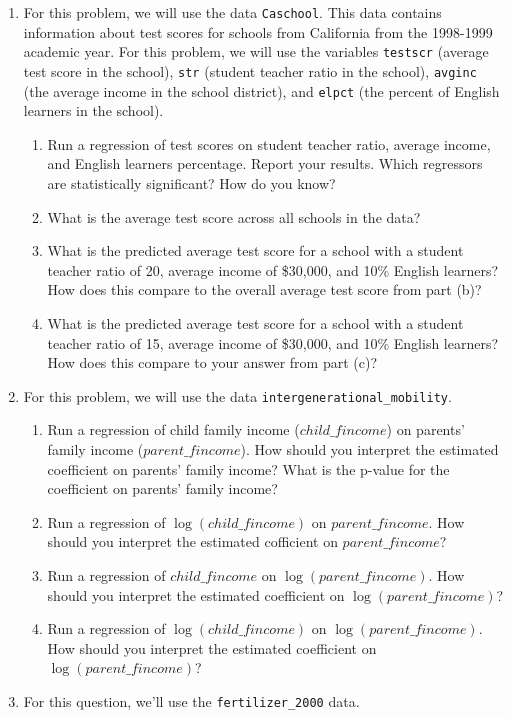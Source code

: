 \documentclass[
  letterpaper,
  DIV=11,
  numbers=noendperiod]{scrreprt}
\begin{document}
\begin{enumerate}
\def\labelenumi{\arabic{enumi}.}
\item
  For this problem, we will use the data \texttt{Caschool}. This data
  contains information about test scores for schools from California
  from the 1998-1999 academic year. For this problem, we will use the
  variables \texttt{testscr} (average test score in the school),
  \texttt{str} (student teacher ratio in the school), \texttt{avginc}
  (the average income in the school district), and \texttt{elpct} (the
  percent of English learners in the school).

  \begin{enumerate}
  \def\labelenumii{\alph{enumii})}
  \item
    Run a regression of test scores on student teacher ratio, average
    income, and English learners percentage. Report your results. Which
    regressors are statistically significant? How do you know?
  \item
    What is the average test score across all schools in the data?
  \item
    What is the predicted average test score for a school with a student
    teacher ratio of 20, average income of \$30,000, and 10\% English
    learners? How does this compare to the overall average test score
    from part (b)?
  \item
    What is the predicted average test score for a school with a student
    teacher ratio of 15, average income of \$30,000, and 10\% English
    learners? How does this compare to your answer from part (c)?
  \end{enumerate}
\item
  For this problem, we will use the data
  \texttt{intergenerational\_mobility}.

  \begin{enumerate}
  \def\labelenumii{\alph{enumii})}
  \item
    Run a regression of child family income (\(child\_fincome\)) on
    parents' family income (\(parent\_fincome\)). How should you
    interpret the estimated coefficient on parents' family income? What
    is the p-value for the coefficient on parents' family income?
  \item
    Run a regression of \(\log(child\_fincome)\) on \(parent\_fincome\).
    How should you interpret the estimated cofficient on
    \(parent\_fincome\)?
  \item
    Run a regression of \(child\_fincome\) on \(\log(parent\_fincome)\).
    How should you interpret the estimated coefficient on
    \(\log(parent\_fincome)\)?
  \item
    Run a regression of \(\log(child\_fincome)\) on
    \(\log(parent\_fincome)\). How should you interpret the estimated
    coefficient on \(\log(parent\_fincome)\)?
  \end{enumerate}
\item
  For this question, we'll use the \texttt{fertilizer\_2000} data.


\end{enumerate}
\end{document}
